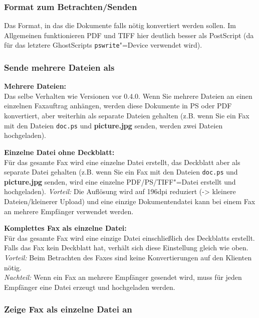 \documentclass[a4paper,10pt,halfparskip,noparindent]{scrartcl}
\begin{document}
\subsubsection{Format zum Betrachten/Senden}

Das Format, in das die Dokumente falls nötig konvertiert werden sollen. Im Allgemeinen funktionieren PDF und TIFF hier deutlich besser als PostScript (da für das letztere GhostScripts \texttt{pswrite}"=Device verwendet wird).

\subsubsection{Sende mehrere Dateien als}

{\parindent0pt
\textbf{Mehrere Dateien:}\\
Das selbe Verhalten wie Versionen vor 0.4.0. Wenn Sie mehrere Dateien an einen einzelnen Faxauftrag anhängen, werden diese Dokumente in PS oder PDF konvertiert, aber weiterhin als separate Dateien gehalten (z.B. wenn Sie ein Fax mit den Dateien \texttt{doc.ps} und \textbf{picture.jpg} senden, werden zwei Dateien hochgeladen).
\medskip

\textbf{Einzelne Datei ohne Deckblatt:}\\
Für das gesamte Fax wird eine einzelne Datei erstellt, das Deckblatt aber als separate Datei gehalten (z.B. wenn Sie ein Fax mit den Dateien \texttt{doc.ps} und \textbf{picture.jpg} senden, wird eine einzelne PDF/PS/TIFF"=Datei erstellt und hochgeladen).
\textit{Vorteil:} Die Auflösung wird auf 196dpi reduziert (-> kleinere Dateien/kleinerer Upload) und eine einzige Dokumentendatei kann bei einem Fax an mehrere Empfänger verwendet werden.
\medskip

\textbf{Komplettes Fax als einzelne Datei:}\\
Für das gesamte Fax wird eine einzige Datei einschließlich des Deckblatts erstellt. Falls das Fax kein Deckblatt hat, verhält sich diese Einstellung gleich wie oben.\\
\textit{Vorteil:} Beim Betrachten des Faxes sind keine Konvertierungen auf den Klienten nötig.\\
\textit{Nachteil:} Wenn ein Fax an mehrere Empfänger gesendet wird, muss für jeden Empfänger eine Datei erzeugt und hochgeladen werden.
}

\subsubsection{Zeige Fax als einzelne Datei an}
\end{document}
